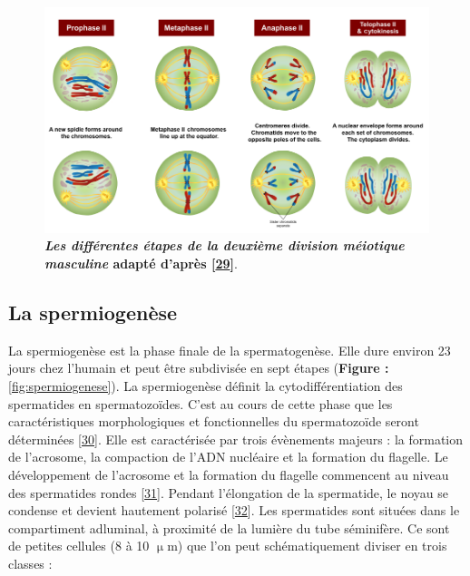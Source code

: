 \documentclass[12pt,a4paper,twoside]{ugathesis}
\theoremstyle{definition}
\theoremstyle{definition}
\theoremstyle{definition}
\theoremstyle{remark}
\begin{document}
\begin{figure}

{\centering \includegraphics[scale=0.43]{figure/MeiosisII} 

}

\caption[Les différentes étapes de la deuxième division méiotique masculine]{\textbf{\emph{Les différentes étapes de la deuxième
division méiotique masculine} adapté d'après
{[}\protect\hyperlink{ref-Reece2014}{29}{]}}.}\label{fig:meioseii}
\end{figure}





\newpage

\hypertarget{spermiogenese}{\subsection{La
spermiogenèse}\label{spermiogenese}}

La spermiogenèse est la phase finale de la spermatogenèse. Elle dure
environ 23 jours chez l'humain et peut être subdivisée en sept étapes
(\textbf{Figure : }\ref{fig:spermiogenese}). La spermiogenèse définit la
cytodifférentiation des spermatides en spermatozoïdes. C'est au cours de
cette phase que les caractéristiques morphologiques et fonctionnelles du
spermatozoïde seront déterminées
{[}\protect\hyperlink{ref-YvesClermontRichardOko1993}{30}{]}. Elle est
caractérisée par trois évènements majeurs : la formation de l'acrosome,
la compaction de l'ADN nucléaire et la formation du flagelle. Le
développement de l'acrosome et la formation du flagelle commencent au
niveau des spermatides rondes
{[}\protect\hyperlink{ref-Escalier1991}{31}{]}. Pendant l'élongation de
la spermatide, le noyau se condense et devient hautement polarisé
{[}\protect\hyperlink{ref-Hamilton1987}{32}{]}. Les spermatides sont
situées dans le compartiment adluminal, à proximité de la lumière du
tube séminifère. Ce sont de petites cellules (8 à 10 \(\upmu\)m) que
l'on peut schématiquement diviser en trois classes :
\end{document}
